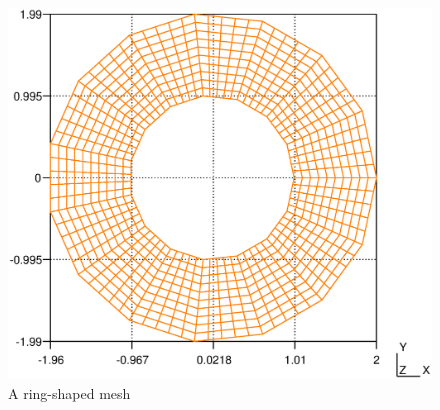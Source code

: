 \begin{figure}[ht] \centering
  \includegraphics[width=115mm]{ring.eps}
  \caption{A ring-shaped mesh}
  \label{\numb section 9.\numb fig 1}
\end{figure}

